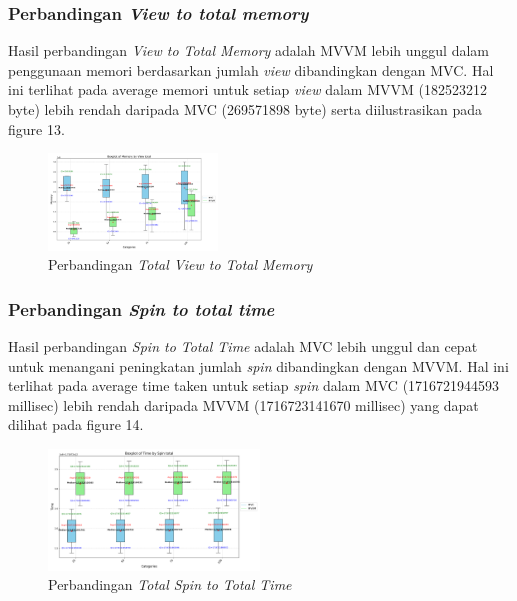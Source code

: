 \documentclass[conference]{IEEEtran}
\begin{document}
	\subsubsection{Perbandingan \textit{View to total memory}}
	Hasil perbandingan \textit{View to Total Memory} adalah MVVM lebih unggul dalam penggunaan memori berdasarkan jumlah \textit{view} dibandingkan dengan MVC. Hal ini terlihat pada average memori untuk setiap \textit{view} dalam MVVM (182523212 byte) lebih rendah daripada MVC (269571898 byte) serta diilustrasikan pada figure 13.
	\begin{figure}[h]
		\centering
		\includegraphics[width=0.4\textwidth]{../mvc-mvvm/plot_view_total_memory.pdf}
		\caption{Perbandingan \textit{Total View to Total Memory}}
		\label{fig:total_view_to_total_memory}
	\end{figure}
	
	\subsubsection{Perbandingan \textit{Spin to total time}}
	Hasil perbandingan \textit{Spin to Total Time} adalah MVC lebih unggul dan cepat untuk menangani peningkatan jumlah \textit{spin} dibandingkan dengan MVVM. Hal ini terlihat pada average time taken untuk setiap \textit{spin} dalam MVC (1716721944593 millisec) lebih rendah daripada MVVM (1716723141670 millisec) yang dapat dilihat pada figure 14.
	
	\begin{figure}[h]
		\centering
		\includegraphics[width=0.5\textwidth]{../mvc-mvvm/plot_spin_total_time.pdf}
		\caption{Perbandingan \textit{Total Spin to Total Time}}
		\label{fig:total_spin_to_total_time}
	\end{figure}
	
	\vspace{3cm}
	
\end{document}
